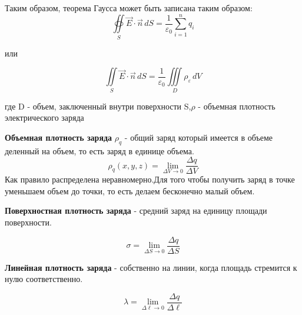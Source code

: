 \documentclass[../main.tex]{subfiles}
\begin{document}
Таким образом, теорема Гаусса может быть записана таким образом:
\[ \oiint\limits_S \vec E \cdot \vec n \,  dS = \frac{1}{\varepsilon_0} \sum_{i=1}^{n} q_i\]
\begin{center}
    или
\end{center}
\[\iint \limits_S \vec E \cdot \vec n \, dS  = \frac{1}{\varepsilon_0} \iiint\limits_D \rho_\varepsilon \, dV\]
\begin{center}
    где D - объем, заключенный внутри поверхности S,\linebreak $\rho$ - объемная плотность электрического заряда
\end{center}


 \textbf{Объемная плотность заряда} $\rho_q$ - общий заряд который имеется в объеме деленный на объем, то есть заряд в единице объема.
\[ \rho_q(x,y,z) = \lim_{\Delta V \to 0} \frac{\Delta q}{\Delta V}\]
Как правило распределена неравномерно.Для того чтобы получить заряд в точке уменьшаем объем до точки, то есть делаем бесконечно малый объем.

 \textbf{Поверхностная плотность заряда} - средний заряд на единицу площади поверхности.

\[ \sigma = \lim_{\Delta S \to 0} \frac{\Delta q}{\Delta S}\]


 \textbf{Линейная плотность заряда}  - собственно на линии, когда площадь стремится к нулю соответственно.

\[ \lambda = \lim_{\Delta \ell \to 0} \frac{\Delta q}{\Delta \ell}\]
\end{document}
